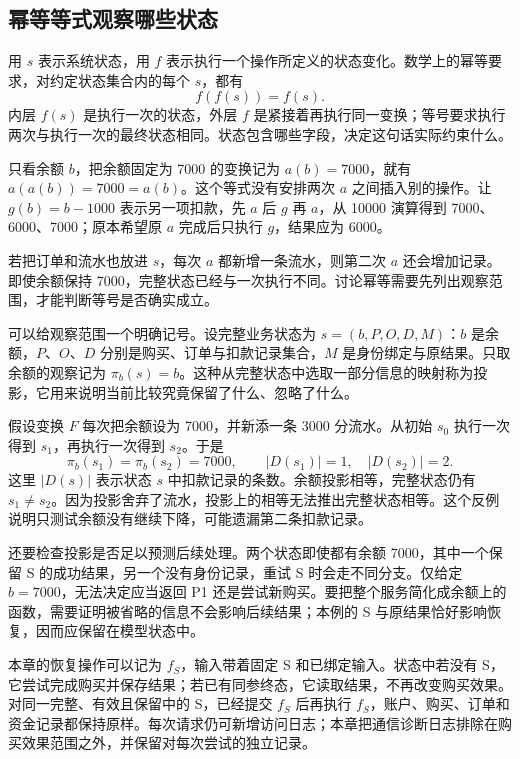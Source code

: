 \subsection*{幂等等式观察哪些状态}

用 \(s\) 表示系统状态，用 \(f\) 表示执行一个操作所定义的状态变化。数学上的幂等要求，对约定状态集合内的每个 \(s\)，都有
\[
 f(f(s))=f(s).
\]
内层 \(f(s)\) 是执行一次的状态，外层 \(f\) 是紧接着再执行同一变换；等号要求执行两次与执行一次的最终状态相同。状态包含哪些字段，决定这句话实际约束什么。

只看余额 \(b\)，把余额固定为 7000 的变换记为 \(a(b)=7000\)，就有 \(a(a(b))=7000=a(b)\)。这个等式没有安排两次 \(a\) 之间插入别的操作。让 \(g(b)=b-1000\) 表示另一项扣款，先 \(a\) 后 \(g\) 再 \(a\)，从 10000 演算得到 7000、6000、7000；原本希望原 \(a\) 完成后只执行 \(g\)，结果应为 6000。

若把订单和流水也放进 \(s\)，每次 \(a\) 都新增一条流水，则第二次 \(a\) 还会增加记录。即使余额保持 7000，完整状态已经与一次执行不同。讨论幂等需要先列出观察范围，才能判断等号是否确实成立。



可以给观察范围一个明确记号。设完整业务状态为 \(s=(b,P,O,D,M)\)：\(b\) 是余额，\(P\)、\(O\)、\(D\) 分别是购买、订单与扣款记录集合，\(M\) 是身份绑定与原结果。只取余额的观察记为 \(\pi_b(s)=b\)。这种从完整状态中选取一部分信息的映射称为投影，它用来说明当前比较究竟保留了什么、忽略了什么。

假设变换 \(F\) 每次把余额设为 7000，并新添一条 3000 分流水。从初始 \(s_0\) 执行一次得到 \(s_1\)，再执行一次得到 \(s_2\)。于是
\[
 \pi_b(s_1)=\pi_b(s_2)=7000,
 \qquad |D(s_1)|=1,\quad |D(s_2)|=2.
\]
这里 \(|D(s)|\) 表示状态 \(s\) 中扣款记录的条数。余额投影相等，完整状态仍有 \(s_1\ne s_2\)。因为投影舍弃了流水，投影上的相等无法推出完整状态相等。这个反例说明只测试余额没有继续下降，可能遗漏第二条扣款记录。



还要检查投影是否足以预测后续处理。两个状态即使都有余额 7000，其中一个保留 S 的成功结果，另一个没有身份记录，重试 S 时会走不同分支。仅给定 \(b=7000\)，无法决定应当返回 P1 还是尝试新购买。要把整个服务简化成余额上的函数，需要证明被省略的信息不会影响后续结果；本例的 S 与原结果恰好影响恢复，因而应保留在模型状态中。

本章的恢复操作可以记为 \(f_S\)，输入带着固定 S 和已绑定输入。状态中若没有 S，它尝试完成购买并保存结果；若已有同参终态，它读取结果，不再改变购买效果。对同一完整、有效且保留中的 S，已经提交 \(f_S\) 后再执行 \(f_S\)，账户、购买、订单和资金记录都保持原样。每次请求仍可新增访问日志；本章把通信诊断日志排除在购买效果范围之外，并保留对每次尝试的独立记录。

